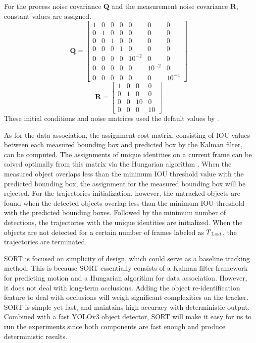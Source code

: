 For the process noise covariance $\mathbf{Q}$ and the measurement noise covariance $\mathbf{R}$, constant values are assigned.
\begin{equation}
\mathbf{Q} = \left[ \begin{matrix} 
1 & 0 & 0 & 0 & 0 & 0 & 0 \\ 
0 & 1 & 0 & 0 & 0 & 0 & 0 \\ 
0 & 0 & 1 & 0 & 0 & 0 & 0 \\ 
0 & 0 & 0 & 1 & 0 & 0 & 0 \\ 
0 & 0 & 0 & 0 & 10^{-2} & 0 & 0 \\
0 & 0 & 0 & 0 & 0 & 10^{-2} & 0 \\ 
0 & 0 & 0 & 0 & 0 & 0 & 10^{-4} \end{matrix} \right]
\label{eqn:P_0}
\end{equation}
\begin{equation}
\mathbf{R} = \left[ \begin{matrix}   
  1  &  0  &  0  &  0 \\
  0  &  1  &  0  &  0 \\
  0  &  0  &  10 &  0 \\
  0  &  0  &  0  &  10 \end{matrix} \right]
\label{eqn:R}
\end{equation}
These initial conditions and noise matrices used the default values by \cite{bewley_simple_2016}.

As for the data association, the assignment cost matrix, consisting of IOU values between each measured bounding box and predicted box by the Kalman filter, can be computed. The assignments of unique identities on a current frame can be solved optimally from this matrix via the Hungarian algorithm \cite{kuhn_hungarian_1955}. When the measured object overlaps less than the minimum IOU threshold value with the predicted bounding box, the assignment for the measured bounding box will be rejected. For the trajectories initialization, however, the untracked objects are found when the detected objects overlap less than the minimum IOU threshold with the predicted bounding boxes. Followed by the minimum number of detections, the trajectories with the unique identities are initialized. When the objects are not detected for a certain number of frames labeled as $T\textsubscript{Lost}$, the trajectories are terminated.

SORT is focused on simplicity of design, which could serve as a baseline tracking method. This is because SORT essentially consists of a Kalman filter framework for predicting motion and a Hungarian algorithm for data association. However, it does not deal with long-term occlusions. Adding the object re-identification feature to deal with occlusions will weigh significant complexities on the tracker. SORT is simple yet fast, and maintains high accuracy with deterministic output. Combined with a fast YOLOv3 object detector, SORT will make it easy for us to run the experiments since both components are fast enough and produce deterministic results.
